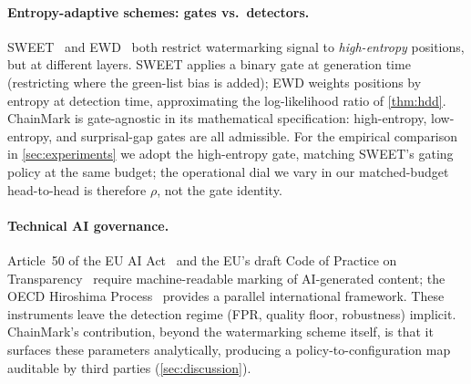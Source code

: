 \paragraph{Entropy-adaptive schemes: gates vs.\ detectors.}
SWEET~\citep{lee2023sweet} and EWD~\citep{lu2024ewd} both restrict
watermarking signal to \emph{high-entropy} positions, but at
different layers. SWEET applies a binary gate at generation time
(restricting where the green-list bias is added); EWD weights
positions by entropy at detection time, approximating the
log-likelihood ratio of \autoref{thm:hdd}. ChainMark is
gate-agnostic in its mathematical specification: high-entropy,
low-entropy, and surprisal-gap gates are all admissible. For the
empirical comparison in \autoref{sec:experiments} we adopt the
high-entropy gate, matching SWEET's gating policy at the same
budget; the operational dial we vary in our matched-budget
head-to-head is therefore $\rho$, not the gate identity.

\paragraph{Technical AI governance.} Article~50 of the EU AI
Act~\citep{euaiact2024} and the EU's draft Code of Practice on
Transparency~\citep{eucodepractice2025} require machine-readable
marking of AI-generated content; the OECD Hiroshima
Process~\citep{oecdhiroshima2024} provides a parallel international
framework. These instruments leave the detection regime
(FPR, quality floor, robustness) implicit. ChainMark's contribution, beyond
the watermarking scheme itself, is that it surfaces these parameters
analytically, producing a policy-to-configuration map auditable by
third parties (\autoref{sec:discussion}).
